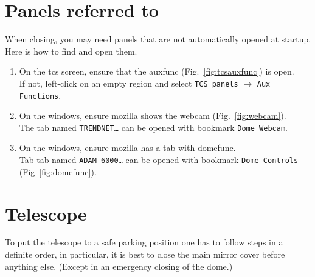 \documentclass[11pt,fleqn]{book} %
\begin{document}
\section{Panels referred to}
When closing, you may need panels that are not automatically opened at startup. Here is how to find and open them.
\begin{enumerate}
\item On the \gls{tcs} screen, ensure that the \gls{auxfunc} (Fig.~\ref{fig:tcsauxfunc}) is open.\\
      If not, left-click on an empty region and select \texttt{TCS panels} $\rightarrow$ \texttt{Aux Functions}.
\item On the \gls{windows}, ensure mozilla shows the \gls{webcam} (Fig.~\ref{fig:webcam}).\\
      The tab named \texttt{TRENDNET…} can be opened with bookmark \texttt{Dome Webcam}.
\item On the \gls{windows}, ensure mozilla has a tab with \gls{domefunc}.\\
      Tab tab named \texttt{ADAM 6000…} can be opened with bookmark \texttt{Dome Controls} (Fig~\ref{fig:domefunc}).
\end{enumerate}

\section{Telescope}

To put the telescope to a safe parking position one has to follow steps in a definite order, in particular, it is best to close the main mirror cover before anything else. (Except in an emergency closing of the dome.) 
\end{document}
